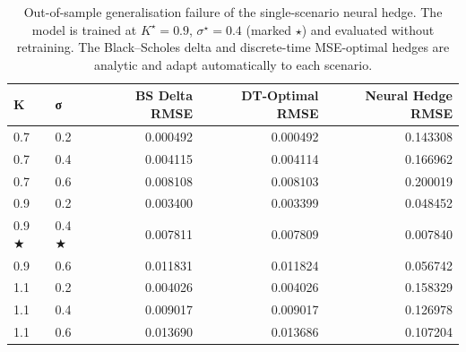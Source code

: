 \begin{table}
\caption{Out-of-sample generalisation failure of the single-scenario neural hedge. The model is trained at $K^\star=0.9$, $\sigma^\star=0.4$ (marked $\star$) and evaluated without retraining. The Black--Scholes delta and discrete-time MSE-optimal hedges are analytic and adapt automatically to each scenario.}
\label{tab:collapse}
\begin{tabular}{llrrr}
\toprule
K & σ & BS Delta RMSE & DT-Optimal RMSE & Neural Hedge RMSE \\
\midrule
0.7 & 0.2 & 0.000492 & 0.000492 & 0.143308 \\
0.7 & 0.4 & 0.004115 & 0.004114 & 0.166962 \\
0.7 & 0.6 & 0.008108 & 0.008103 & 0.200019 \\
0.9 & 0.2 & 0.003400 & 0.003399 & 0.048452 \\
0.9 ★ & 0.4 ★ & 0.007811 & 0.007809 & 0.007840 \\
0.9 & 0.6 & 0.011831 & 0.011824 & 0.056742 \\
1.1 & 0.2 & 0.004026 & 0.004026 & 0.158329 \\
1.1 & 0.4 & 0.009017 & 0.009017 & 0.126978 \\
1.1 & 0.6 & 0.013690 & 0.013686 & 0.107204 \\
\bottomrule
\end{tabular}
\end{table}
